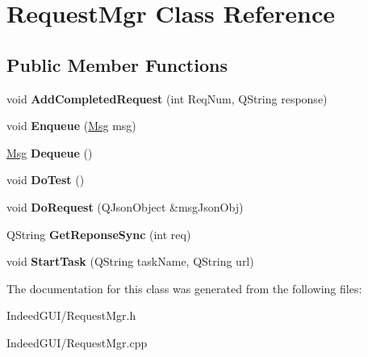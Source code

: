 \hypertarget{class_request_mgr}{}\section{Request\+Mgr Class Reference}
\label{class_request_mgr}
\subsection*{Public Member Functions}
\begin{DoxyCompactItemize}
\item 
\hypertarget{class_request_mgr_a5c73c558ed2e17f02a16f79f274a7860}{}void {\bfseries Add\+Completed\+Request} (int Req\+Num, Q\+String response)\label{class_request_mgr_a5c73c558ed2e17f02a16f79f274a7860}

\item 
\hypertarget{class_request_mgr_aa04662edf879b969aa8e628bc49b6d14}{}void {\bfseries Enqueue} (\hyperlink{class_msg}{Msg} msg)\label{class_request_mgr_aa04662edf879b969aa8e628bc49b6d14}

\item 
\hypertarget{class_request_mgr_a04c4fa4076e1f24967573cbcb22739b9}{}\hyperlink{class_msg}{Msg} {\bfseries Dequeue} ()\label{class_request_mgr_a04c4fa4076e1f24967573cbcb22739b9}

\item 
\hypertarget{class_request_mgr_ae91c04908f629911859cf482835a8a9b}{}void {\bfseries Do\+Test} ()\label{class_request_mgr_ae91c04908f629911859cf482835a8a9b}

\item 
\hypertarget{class_request_mgr_a3ccb25091e8a614572d0e8d8f73bb92e}{}void {\bfseries Do\+Request} (Q\+Json\+Object \&msg\+Json\+Obj)\label{class_request_mgr_a3ccb25091e8a614572d0e8d8f73bb92e}

\item 
\hypertarget{class_request_mgr_a93cbc90353bc1fba427d101a833d3b92}{}Q\+String {\bfseries Get\+Reponse\+Sync} (int req)\label{class_request_mgr_a93cbc90353bc1fba427d101a833d3b92}

\item 
\hypertarget{class_request_mgr_a2d910e45e967b4d886d16e2d19d7d1dc}{}void {\bfseries Start\+Task} (Q\+String task\+Name, Q\+String url)\label{class_request_mgr_a2d910e45e967b4d886d16e2d19d7d1dc}

\end{DoxyCompactItemize}


The documentation for this class was generated from the following files\+:\begin{DoxyCompactItemize}
\item 
Indeed\+G\+U\+I/Request\+Mgr.\+h\item 
Indeed\+G\+U\+I/Request\+Mgr.\+cpp\end{DoxyCompactItemize}
